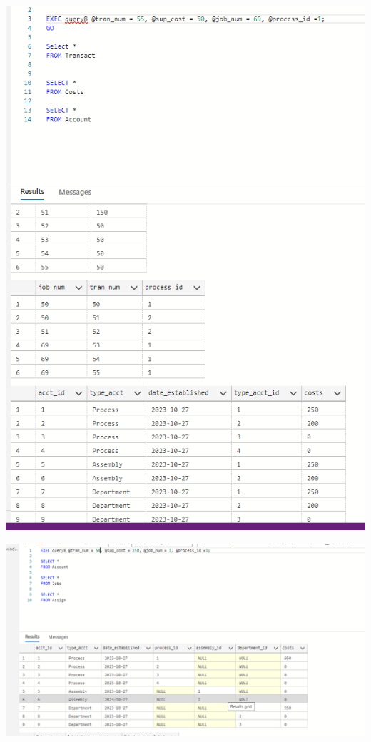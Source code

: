 \documentclass[11pt]{article}
\begin{document}
\begin{enumerate}
\includegraphics[width = \textwidth]{transact4.png}

\includegraphics[width = \textwidth]{transact5.png} 


\end{enumerate}
\end{document}

